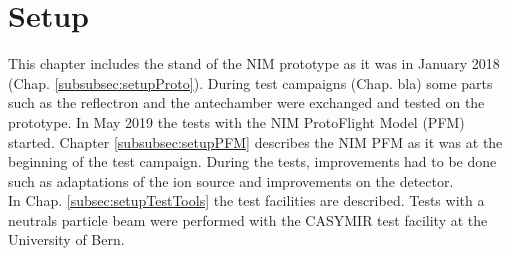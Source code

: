 \section{Setup}\label{sec:setup}

	This chapter includes the stand of the NIM prototype as it was in January 2018 (Chap. \ref{subsubsec:setupProto}). During test campaigns (Chap. bla) some parts such as the reflectron and the antechamber were exchanged and tested on the prototype. In May 2019 the tests with the NIM ProtoFlight Model (PFM) started. Chapter \ref{subsubsec:setupPFM} describes the NIM PFM as it was at the beginning of the test campaign. During the tests, improvements had to be done such as adaptations of the ion source and improvements on the detector.\\
	In Chap. \ref{subsec:setupTestTools} the test facilities are described. Tests with a neutrals particle beam were performed with the CASYMIR test facility at the University of Bern. %
	
	

	
